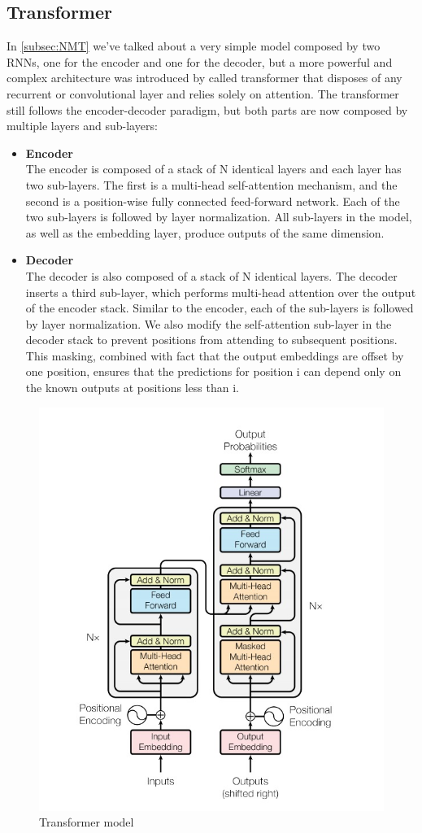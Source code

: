 \subsection{Transformer}\label{subsec:transformer_model}
In \ref{subsec:NMT} we've talked about a very simple model composed by two RNNs, one for the encoder and one for the decoder, but a more powerful and complex architecture was introduced by \cite{vaswani2017attention} called transformer that disposes of any recurrent or convolutional layer and relies solely on attention. The transformer still follows the encoder-decoder paradigm, but both parts are now composed by multiple layers and sub-layers:
\begin{itemize}
    \item \textbf{Encoder}\\
    The encoder is composed of a stack of N identical layers and each layer has two sub-layers. The first is a multi-head self-attention mechanism, and the second is a position-wise fully connected feed-forward network. Each of the two sub-layers is followed by layer normalization. All sub-layers in the model, as well as the embedding layer, produce outputs of the same dimension.
    \item \textbf{Decoder}\\
    The decoder is also composed of a stack of N identical layers. The decoder inserts a third sub-layer, which performs multi-head attention over the output of the encoder stack. Similar to the encoder, each of the sub-layers is followed by layer normalization. We also modify the self-attention sub-layer in the decoder stack to prevent positions from attending to subsequent positions. This masking, combined with fact that the output embeddings are offset by one position, ensures that the predictions for position i can depend only on the known outputs at positions less than i.
\end{itemize}
\begin{figure}[H]%
    \centering
    \includegraphics[width=0.68\linewidth]{images/transformer.png}
    \caption{Transformer model}
    \label{fig:transformer}
\end{figure}

